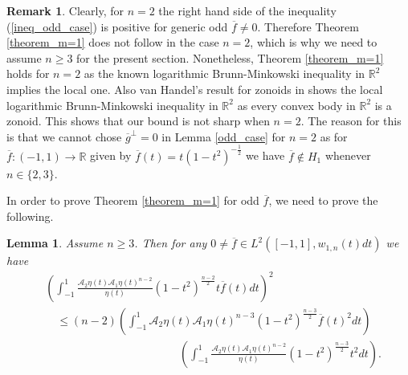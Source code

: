 \documentclass[12pt,twoside]{amsart}
\numberwithin{satz}{section}
\newtheorem{lemma}[satz]{Lemma}
\theoremstyle{definition}
\newtheorem{remark}[satz]{Remark}
\numberwithin{equation}{section}
\newcommand\R{\mathbb{R}}
\begin{document}
	\begin{remark}\label{remark_n=2}
		Clearly, for $n=2$ the right hand side of the inequality (\ref{ineq_odd_case}) is positive for generic odd $\overline{f}\neq 0$. Therefore Theorem \ref{theorem_m=1} does not follow in the case $n=2$, which is why we need to assume $n\geq 3$ for the present section.  Nonetheless, Theorem \ref{theorem_m=1} holds for $n=2$ as the known logarithmic Brunn-Minkowski inequality in $\R^2$ implies the local one. Also van Handel's result for zonoids in \cite{vanhandel} shows the local logarithmic Brunn-Minkowski inequality in $\R^2$ as every convex body in $\R^2$ is a zonoid. This shows that our bound is not sharp when $n=2$. The reason for this is that we cannot chose $\overline{g}^\perp=0$ in Lemma \ref{odd_case} for $n=2$ as for $\overline{f}:(-1,1)\to \R$ given by $\overline{f}(t)=t(1-t^2)^{-\frac{1}{2}}$ we have $\overline{f}\notin H_1$ whenever $n\in\{2,3\}$. 
	\end{remark}
	
	In order to prove Theorem \ref{theorem_m=1} for odd $\overline{f}$, we need to prove the following.
	
	\begin{lemma}\label{lemma_CS_odd}
		Assume $n\geq 3$. Then for any $0\neq\overline{f}\in L^2([-1,1],w_{1,n}(t)dt)$ we have	
		\begin{align*}
			&\left(\int_{-1}^1\frac{\mathcal{A}_2\eta(t)\mathcal{A}_1\eta(t)^{n-2}}{\eta(t)}(1-t^2)^{\frac{n-2}{2}}t\overline{f}(t)dt\right)^2 \\
			& \quad \leq  (n-2) \left(\int_{-1}^1 \mathcal{A}_2\eta(t)\mathcal{A}_1\eta(t)^{n-3} (1-t^2)^{\frac{n-3}{2}} \overline{f}(t)^2dt\right)\\
			& \hspace{5cm} \left(\int_{-1}^1\frac{\mathcal{A}_2\eta(t)\mathcal{A}_1\eta(t)^{n-2}}{\eta(t)}(1-t^2)^{\frac{n-3}{2}}t^2dt\right).
		\end{align*}
	\end{lemma}
	
\end{document}
